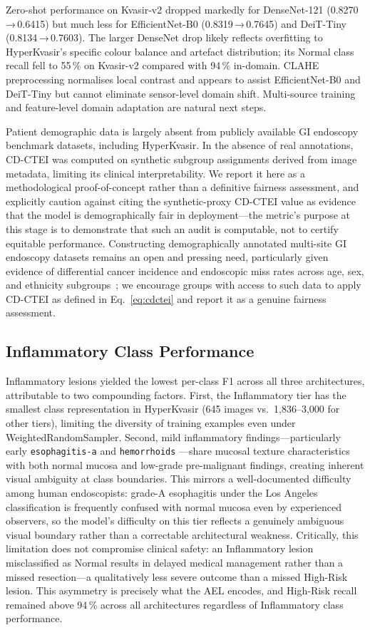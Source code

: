 \documentclass[11pt,a4paper]{article}
\begin{document}
Zero-shot performance on Kvasir-v2 dropped markedly for DenseNet-121
(0.8270\,→\,0.6415) but much less for EfficientNet-B0 (0.8319\,→\,0.7645)
and DeiT-Tiny (0.8134\,→\,0.7603). The larger DenseNet drop likely reflects
overfitting to HyperKvasir's specific colour balance and artefact
distribution; its Normal class recall fell to 55\,\% on Kvasir-v2 compared
with 94\,\% in-domain. CLAHE preprocessing normalises local contrast and
appears to assist EfficientNet-B0 and DeiT-Tiny but cannot eliminate
sensor-level domain shift. Multi-source training and feature-level domain
adaptation are natural next steps.

Patient demographic data is largely absent from publicly available GI
endoscopy benchmark datasets, including HyperKvasir. In the absence of real
annotations, CD-CTEI was computed on synthetic subgroup assignments derived
from image metadata, limiting its clinical interpretability. We report it
here as a methodological proof-of-concept rather than a definitive fairness
assessment, and explicitly caution against citing the synthetic-proxy
CD-CTEI value as evidence that the model is demographically fair in
deployment---the metric's purpose at this stage is to demonstrate that such
an audit is computable, not to certify equitable performance. Constructing
demographically annotated multi-site GI endoscopy datasets remains an open
and pressing need, particularly given evidence of differential cancer
incidence and endoscopic miss rates across age, sex, and ethnicity
subgroups~\citep{Kaminski2017}; we encourage groups with access to such data
to apply CD-CTEI as defined in Eq.~\ref{eq:cdctei} and report it as a
genuine fairness assessment.

\subsection{Inflammatory Class Performance}

Inflammatory lesions yielded the lowest per-class F1 across all three
architectures, attributable to two compounding factors. First, the
Inflammatory tier has the smallest class representation in HyperKvasir
(645 images vs.\ 1,836--3,000 for other tiers), limiting the diversity of
training examples even under WeightedRandomSampler. Second, mild inflammatory
findings---particularly early \texttt{esophagitis-a} and \texttt{hemorrhoids}
---share mucosal texture characteristics with both normal mucosa and low-grade
pre-malignant findings, creating inherent visual ambiguity at class boundaries.
This mirrors a well-documented difficulty among human endoscopists: grade-A
esophagitis under the Los Angeles classification is frequently confused with
normal mucosa even by experienced observers, so the model's difficulty on
this tier reflects a genuinely ambiguous visual boundary rather than a
correctable architectural weakness. Critically, this limitation does not
compromise clinical safety: an
Inflammatory lesion misclassified as Normal results in delayed medical
management rather than a missed resection---a qualitatively less severe
outcome than a missed High-Risk lesion. This asymmetry is precisely what the
AEL encodes, and High-Risk recall remained above 94\,\% across all
architectures regardless of Inflammatory class performance.
\end{document}

